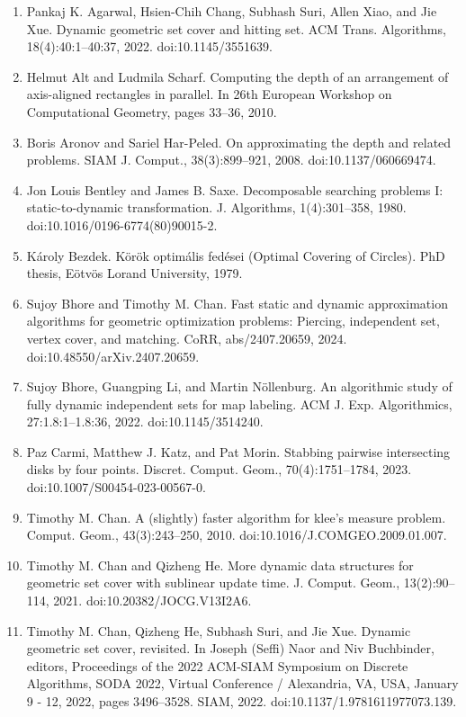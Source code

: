 \documentclass[10pt,a4paper]{article}
\begin{document}
\begin{enumerate}
\item[]  [1]  Pankaj K. Agarwal, Hsien-Chih Chang, Subhash Suri, Allen Xiao, and Jie Xue.  Dynamic geometric set cover and hitting set.  ACM Trans. Algorithms, 18(4):40:1–40:37, 2022.  doi:10.1145/3551639.  
\item[]  [2]  Helmut Alt and Ludmila Scharf.  Computing the depth of an arrangement of axis-aligned rectangles in parallel.  In 26th European Workshop on Computational Geometry, pages 33–36, 2010.  
\item[]  [3]  Boris Aronov and Sariel Har-Peled.  On approximating the depth and related problems.  SIAM J. Comput., 38(3):899–921, 2008.  doi:10.1137/060669474.  
\item[]  [4]  Jon Louis Bentley and James B. Saxe.  Decomposable searching problems I: static-to-dynamic transformation.  J. Algorithms, 1(4):301–358, 1980.  doi:10.1016/0196-6774(80)90015-2.  
\item[]  [5]  Károly Bezdek.  Körök optimális fedései (Optimal Covering of Circles).  PhD thesis, Eötvös Lorand University, 1979.  
\item[]  [6]  Sujoy Bhore and Timothy M. Chan.  Fast static and dynamic approximation algorithms for geometric optimization problems: Piercing, independent set, vertex cover, and matching.  CoRR, abs/2407.20659, 2024.  doi:10.48550/arXiv.2407.20659.  
\item[]  [7]  Sujoy Bhore, Guangping Li, and Martin Nöllenburg.  An algorithmic study of fully dynamic independent sets for map labeling.  ACM J. Exp. Algorithmics, 27:1.8:1–1.8:36, 2022.  doi:10.1145/3514240.  
\item[]  [8]  Paz Carmi, Matthew J. Katz, and Pat Morin.  Stabbing pairwise intersecting disks by four points.  Discret. Comput. Geom., 70(4):1751–1784, 2023.  doi:10.1007/S00454-023-00567-0.  
\item[]  [9]  Timothy M. Chan.  A (slightly) faster algorithm for klee’s measure problem.  Comput. Geom., 43(3):243–250, 2010.  doi:10.1016/J.COMGEO.2009.01.007.  
\item[]  [10]  Timothy M. Chan and Qizheng He.  More dynamic data structures for geometric set cover with sublinear update time.  J. Comput. Geom., 13(2):90–114, 2021.  doi:10.20382/JOCG.V13I2A6.  
\item[]  [11]  Timothy M. Chan, Qizheng He, Subhash Suri, and Jie Xue.  Dynamic geometric set cover, revisited.  In Joseph (Seffi) Naor and Niv Buchbinder, editors, Proceedings of the 2022 ACM-SIAM Symposium on Discrete Algorithms, SODA 2022, Virtual Conference / Alexandria, VA, USA, January 9 - 12, 2022, pages 3496–3528. SIAM, 2022.  doi:10.1137/1.9781611977073.139.  

\end{enumerate}
\end{document}
